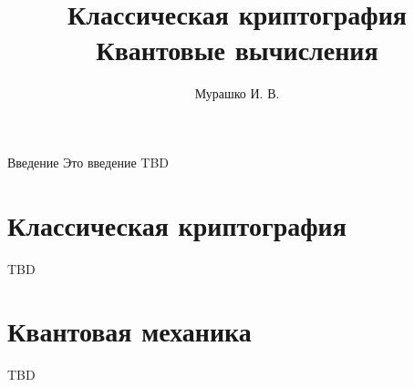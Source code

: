 \documentclass[10pt,pdf,hyperref={unicode}]{beamer}
\title[Криптография и квантовые вычисления]{Классическая
  криптография\\Квантовые вычисления}
\author{Мурашко И. В.}
\institute{Санкт Петербургский Государственный Политехнический Университет}
\date{}
\begin{document}
\begin{frame}
\titlepage
\end{frame}


\begin{frame}{Введение}
Это введение TBD
\end{frame}

\section{Классическая криптография}
\begin{frame}
TBD
\end{frame}

\section{Квантовая механика}
\begin{frame}
TBD
\end{frame}
\end{document}
